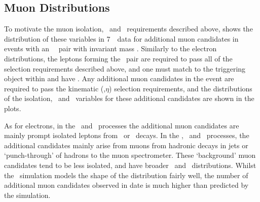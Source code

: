 
\subsection{Muon Distributions}

To motivate the muon isolation, \dzerosig\ and \zzero\ requirements described
above,  shows the distribution of these variables in 7~\tev\ data for additional
muon candidates in events with an \ossf\ \dilepton\ pair with invariant mass \sstooos.
Similarly to the electron distributions, the leptons forming the \dilepton\ pair are required to pass all of
the selection requirements described above, and one must match to the triggering
object within  and have . Any additional muon candidates in the event are required to pass
the kinematic (\pt,$\eta$) selection requirements, and the distributions of the isolation, \dzerosig\ and \zzero\
variables for these additional candidates are shown in the plots. 

As for electrons, in the \WZ\ and \ZZ\ processes the additional muon candidates 
are mainly prompt isolated leptons from \W\ or \Z\ decays. In the \Zll,
\ttbar\ and \WW\ processes, the additional candidates mainly arise from muons from
hadronic decays in jets or `punch-through' of hadrons to the muon spectrometer.
These `background' muon candidates tend to be less isolated, and have broader \dzerosig\
and \zzero\ distributions. Whilst the \mc\ simulation models the shape of the distribution
fairly well, the number of additional muon candidates observed in date is much higher than
predicted by the simulation.

